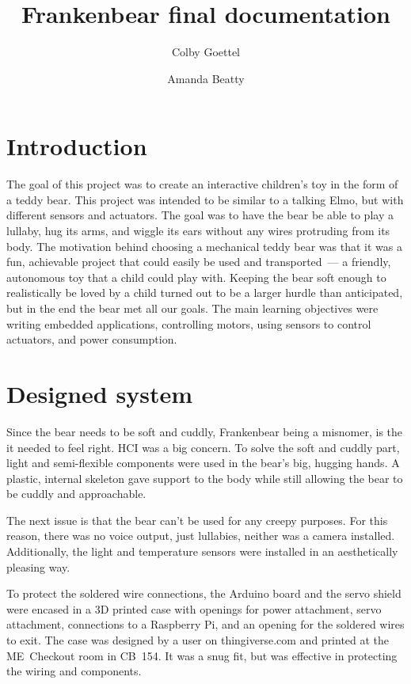 \documentclass{article}
\title{Frankenbear final documentation}
\author{Colby Goettel\and Amanda Beatty}
\begin{document}
\maketitle

\section{Introduction}
The goal of this project was to create an interactive children's toy in the form of a teddy bear. This project was intended to be similar to a talking Elmo, but with different sensors and actuators. The goal was to have the bear be able to play a lullaby, hug its arms, and wiggle its ears without any wires protruding from its body. The motivation behind choosing a mechanical teddy bear was that it was a fun, achievable project that could easily be used and transported~--- a friendly, autonomous toy that a child could play with. Keeping the bear soft enough to realistically be loved by a child turned out to be a larger hurdle than anticipated, but in the end the bear met all our goals. The main learning objectives were writing embedded applications, controlling motors, using sensors to control actuators, and power consumption.

\section{Designed system}
Since the bear needs to be soft and cuddly, Frankenbear being a misnomer, is the it needed to feel right. HCI was a big concern. To solve the soft and cuddly part, light and semi-flexible components were used in the bear's big, hugging hands. A plastic, internal skeleton gave support to the body while still allowing the bear to be cuddly and approachable.

The next issue is that the bear can't be used for any creepy purposes. For this reason, there was no voice output, just lullabies, neither was a camera installed. Additionally, the light and temperature sensors were installed in an aesthetically pleasing way.

To protect the soldered wire connections, the Arduino board and the servo shield were encased in a 3D printed case with openings for power attachment, servo attachment, connections to a Raspberry Pi, and an opening for the soldered wires to exit. The case was designed by a user on thingiverse.com and printed at the ME~Checkout room in CB~154. It was a snug fit, but was effective in protecting the wiring and components.
\end{document}
